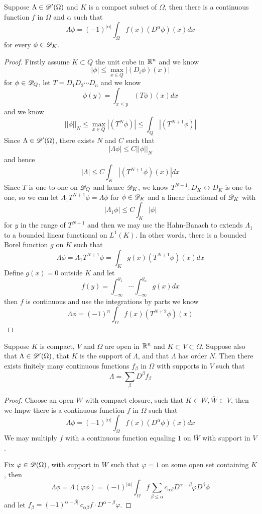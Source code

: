 \begin{theorem}
    Suppose $\Lambda \in \mathscr{D}'(\Omega)$ and $K$ is a compact subset of $\Omega$, then there is a continuous function $f$ in $\Omega$ and $\alpha$ such that
    \[\Lambda \phi = (-1)^{|\alpha|} \int_{\Omega}f(x)(D^{\alpha}\phi)(x) dx\]
    for every $\phi \in \mathscr{D}_K$.
\end{theorem}
\begin{proof}
    Firstly assume $K\subset Q$ the unit cube in $\mathbb{R}^n$ and we know
    \[
    |\phi| \leq \max_{x\in Q}|(D_i \phi)(x)|
    \]
    for $\phi \in \mathscr{D}_Q$, let $T = D_1D_2\cdots D_n$ and we know
    \[
    \phi(y) = \int_{x \leq y}(T\phi)(x)dx
    \]
    and we know
    \[
    ||\phi||_N \leq \max_{x\in Q}|(T^N\phi)| \leq \int_Q|(T^{N+1}\phi)|
    \]
    Since $\Lambda \in \mathscr{D}'(\Omega)$, there exists $N$ and $C$ such that
    \[|\Lambda \phi| \leq C||\phi||_N\]
    and hence
    \[
    |\Lambda| \leq C\int_K|(T^{N+1} \phi)(x)| dx
    \]
    Since $T$ is one-to-one on $\mathscr{D}_Q$  and hence $\mathscr{D}_K$, we know $T^{N+1}: D_K \leftrightarrow D_K$ is one-to-one, so we can let $\Lambda_1 T^{N+1}\phi = \Lambda \phi$ for $\phi \in \mathscr{D}_K$ and a linear functional of $\mathscr{D}_K$ with
    \[
    |\Lambda_1\phi| \leq C\int_K|\phi|
    \]
    for $y$ in the range of $T^{N+1}$ and then we may use the Hahn-Banach to extends $\Lambda_1$ to a bounded linear functional on $L^1(K)$. In other words, there is a bounded Borel function $g$ on $K$ such that
    \[
    \Lambda \phi = \Lambda_1T^{N+1}\phi = \int_K g(x)(T^{N+1} \phi)(x)dx
    \]
    Define $g(x) = 0$ outside $K$ and let 
    \[f(y) = \int_{-\infty}^{y_1}\cdots\int_{-\infty}^{y_n}g(x) dx\]
    then $f$ is continuous and use the integrations by parts we know
    \[
    \Lambda \phi = (-1)^n \int_{\Omega}f(x)(T^{N+2}\phi)(x)
    \]
\end{proof}

\begin{theorem}
    Suppose $K$ is compact, $V$ and $\Omega$ are open in $\mathbb{R}^n$ and $K\subset V\subset \Omega$. Suppose also that $\Lambda \in \mathscr{D}'(\Omega)$, that $K$ is the support of $\Lambda$, and that $\Lambda$ has order $N$. Then there exists finitely many continuous functions $f_{\beta}$ in $\Omega$ with supports in $V$ such that
    \[\Lambda = \sum_{\beta}D^{\beta}f_{\beta}\] 
\end{theorem}
\begin{proof}
    Choose an open $W$ with compact closure, such that $K\subset W, \overline{W}\subset V$, then we lmpw there is a continuous function $f$ in $\Omega$ such that
    \[\Lambda \phi = (-1)^{|\alpha|} \int_{\Omega}f(x)(D^{\alpha}\phi)(x) dx\]
    We may multiply $f$ with a continuous function equaling $1$ on $\overline{W}$ with support in $V$.\par
    Fix $\varphi \in \mathscr{D}(\Omega)$, with support in $W$ such that $\varphi = 1$ on some open set containing $K$, then
    \[
    \Lambda \phi = \Lambda(\varphi\phi) = (-1)^{|\alpha|}\int_{\Omega} f\sum_{\beta \leq \alpha}c_{\alpha\beta}D^{\alpha-\beta}\varphi D^{\beta}\phi
    \]
    and let $f_{\beta} = (-1)^{\alpha-\beta||}c_{\alpha\beta}f\cdot D^{\alpha-\beta}\varphi$.
\end{proof}

